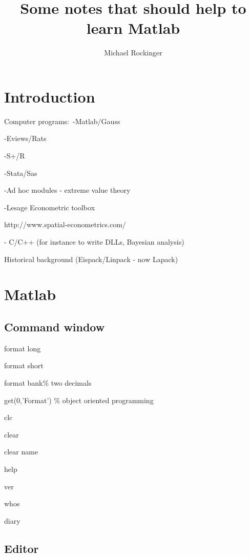 \documentclass[12pt,a4paper]{article}
\begin{document}
\title{Some notes that should help to learn Matlab}
\author{Michael Rockinger}
\maketitle

\section{Introduction}

Computer programs:\ -Matlab/Gauss

\qquad \qquad \qquad \qquad \qquad -Eviews/Rats

\qquad \qquad \qquad \qquad \qquad -S+/R

\qquad \qquad \qquad \qquad \qquad -Stata/Sas

\qquad \qquad \qquad \qquad \qquad -Ad hoc modules - extreme value theory

\qquad \qquad \qquad \qquad \qquad \qquad \qquad \qquad \qquad -Lesage
Econometric toolbox

\qquad \qquad \qquad \qquad \qquad \qquad
http://www.spatial-econometrics.com/

\qquad \qquad \qquad \qquad \qquad - C/C++ (for instance to write DLLs,
Bayesian analysis)

Historical background (Eispack/Linpack - now Lapack)

\section{Matlab}

\subsection{\protect\bigskip Command window}

format long

format short

format bank\qquad \qquad \% two decimals

\bigskip get(0,'Format') \qquad \% object oriented programming

clc

clear

clear name

\bigskip

help

ver

whos

diary

\subsection{Editor}
\end{document}
